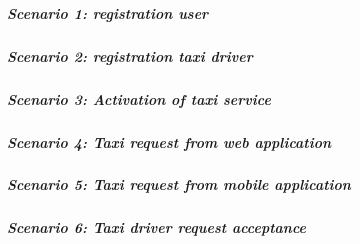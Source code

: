 \subparagraph{Scenario 1: registration user}
\noindent

\subparagraph{Scenario 2: registration taxi driver}
\noindent

\subparagraph{Scenario 3: Activation of taxi service}
\noindent

\subparagraph{Scenario 4: Taxi request from web application}
\noindent

\subparagraph{Scenario 5: Taxi request from mobile application}
\noindent

\subparagraph{Scenario 6: Taxi driver request acceptance}
\noindent